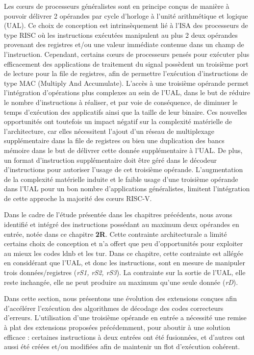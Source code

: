 \documentclass[../main.tex]{subfiles}
\begin{document}
Les cœurs de processeurs généralistes sont en principe conçus de manière à pouvoir délivrer 2 opérandes par cycle d'horloge à l'unité arithmétique et logique (UAL). 
Ce choix de conception est intrinsèquement lié à l'ISA des processeurs de type RISC où les instructions exécutées manipulent au plus 2 deux opérandes provenant des registres et/ou une valeur immédiate contenue dans un champ de l'instruction.
Cependant, certains cœurs de processeurs pensés pour exécuter plus efficacement des applications de traitement du signal possèdent un troisième port de lecture pour la file de registres, afin de permettre l'exécution d'instructions de type MAC (Multiply And Accumulate).
L'accès à une troisième opérande permet l'intégration d'opérations plus complexes au sein de l'UAL, dans le but de réduire le nombre d'instructions à réaliser, et par voie de conséquence, de diminuer le temps d'exécution des applicatifs ainsi que la taille de leur binaire.
Ces nouvelles opportunités ont toutefois un impact négatif sur la complexité matérielle de l'architecture, car elles nécessitent l'ajout d'un réseau de multiplexage supplémentaire dans la file de registres ou bien une duplication des bancs mémoire dans le but de délivrer cette donnée supplémentaire à l'UAL.
De plus, un format d'instruction supplémentaire doit être géré dans le décodeur d'instructions pour autoriser l'usage de cet troisième opérande.
L'augmentation de la complexité matérielle induite et le faible usage d'une troisième opérande dans l'UAL pour un bon nombre d'applications généralistes, limitent l'intégration de cette approche la majorité des cœurs RISC-V.


Dans le cadre de l'étude présentée dans les chapitres précédents, nous avons identifié et intégré des instructions possédant au maximum deux opérandes en entrée, notée dans ce chapitre \textbf{2R}.
Cette contrainte architecturale a limité certains choix de conception et n'a offert que peu d'opportunités pour exploiter au mieux les codes \acrlong{ldnb} et les \acrlong{tur}.
Dans ce chapitre, cette contrainte est allégée en considérant que l'UAL, et donc les instructions, sont en mesure de manipuler trois données/registres (\textit{rS1, rS2, rS3}).
La contrainte sur la sortie de l'UAL, elle reste inchangée, elle ne peut produire au maximum qu'une seule donnée (\textit{rD}).

Dans cette section, nous présentons une évolution des extensions conçues afin d'accélérer l'exécution des algorithmes de décodage des codes correcteurs d'erreurs.
L'utilisation d'une troisième opérande en entrée a nécessité une remise à plat des extensions proposées précédemment, pour aboutir à une solution efficace : certaines instructions à deux entrées ont été fusionnées, et d'autres ont aussi été créées et/ou modifiées afin de maintenir un flot d'exécution cohérent.
\end{document}
